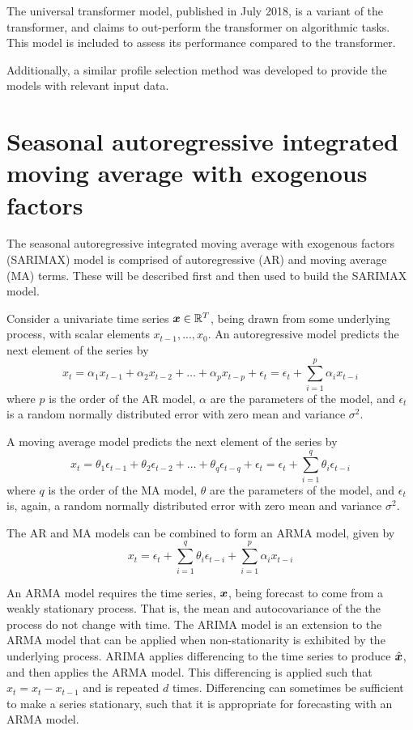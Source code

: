 The universal transformer model, published in July 2018, is a variant of the transformer, and claims to out-perform the transformer on algorithmic tasks.
This model is included to assess its performance compared to the transformer.

Additionally, a similar profile selection method was developed to provide the models with relevant input data.

\section{Seasonal autoregressive integrated moving average with exogenous factors}

The seasonal autoregressive integrated moving average with exogenous factors (SARIMAX) model is comprised of autoregressive (AR) and moving average (MA) terms.
These will be described first and then used to build the SARIMAX model.

Consider a univariate time series ${\bm{x}} \in \mathbb{R}^{T}$, being drawn from some underlying process, with scalar elements $x_{t-1}, ..., x_{0}$. 
An autoregressive model predicts the next element of the series by
\begin{equation}
x_{t} = \alpha_{1}x_{t-1} + \alpha_{2}x_{t-2} + \ldots + \alpha_{p}x_{t-p} + \epsilon_{t} = \epsilon_{t} + \sum_{i=1}^{p}\alpha_{i}x_{t-i}
\end{equation}
where $p$ is the order of the AR model, $\alpha$ are the parameters of the model, and $\epsilon_{t}$ is a random normally distributed error with zero mean and variance $\sigma^2$. 

A moving average model predicts the next element of the series by
\begin{equation}
x_{t} = \theta_{1}\epsilon_{t-1} + \theta_{2}\epsilon_{t-2} + \ldots + \theta_{q}\epsilon_{t-q} + \epsilon_{t} = \epsilon_{t} + \sum_{i=1}^{q}\theta_{i}\epsilon_{t-i}
\end{equation}
where $q$ is the order of the MA model, $\theta$ are the parameters of the model, and $\epsilon_{t}$ is, again, a random normally distributed error with zero mean and variance $\sigma^2$.

The AR and MA models can be combined to form an ARMA model, given by 
\begin{equation}
x_{t} = \epsilon_{t} + \sum_{i=1}^{q}\theta_{i}\epsilon_{t-i} + \sum_{i=1}^{p}\alpha_{i}x_{t-i}
\end{equation}

An ARMA model requires the time series, ${\bm{x}}$, being forecast to come from a weakly stationary process.
That is, the mean and autocovariance of the the process do not change with time.
The ARIMA model is an extension to the ARMA model that can be applied when non-stationarity is exhibited by the underlying process.
ARIMA applies differencing to the time series to produce $\hat{{\bm{x}}}$, and then applies the ARMA model.
This differencing is applied such that $\hat{x}_{t} = x_{t} - x_{t-1}$ and is repeated $d$ times.
Differencing can sometimes be sufficient to make a series stationary, such that it is appropriate for forecasting with an ARMA model.

